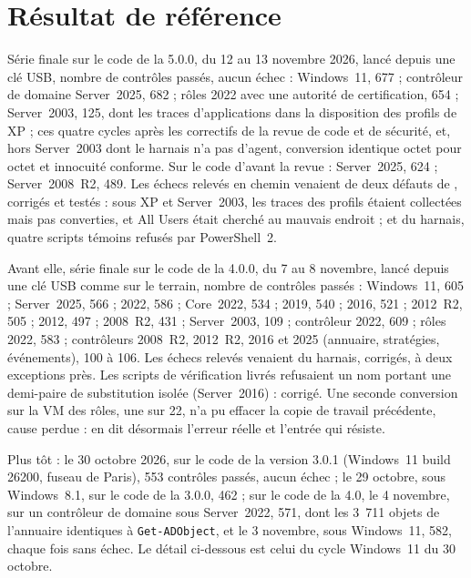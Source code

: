 \documentclass[11pt,a4paper,oneside]{report}
\begin{document}
\section{Résultat de référence}

Série finale sur le code de la 5.0.0, du 12 au 13 novembre 2026, \wac{} lancé
depuis une clé USB, nombre de contrôles passés, aucun échec : Windows~11, 677 ;
contrôleur de domaine Server~2025, 682 ; rôles 2022 avec une autorité de
certification, 654 ; Server~2003, 125, dont les traces d'applications dans la
disposition des profils de XP ; ces quatre cycles après les correctifs de la
revue de code et de sécurité, et, hors Server~2003 dont le harnais n'a pas
d'agent, conversion identique octet pour octet et innocuité conforme. Sur le code d'avant la revue : Server~2025, 624 ;
Server~2008~R2, 489. Les échecs relevés en
chemin venaient de deux défauts de \wac{}, corrigés et testés : sous XP et
Server~2003, les traces des profils étaient collectées mais pas converties, et
All Users était cherché au mauvais endroit ; et du harnais, quatre scripts
témoins refusés par PowerShell~2.

Avant elle, série finale sur le code de la 4.0.0, du 7 au 8 novembre, \wac{} lancé depuis
une clé USB comme sur le terrain, nombre de contrôles passés : Windows~11, 605 ;
Server~2025, 566 ; 2022, 586 ; Core~2022, 534 ; 2019, 540 ; 2016, 521 ;
2012~R2, 505 ; 2012, 497 ; 2008~R2, 431 ; Server~2003, 109 ; contrôleur 2022,
609 ; rôles 2022, 583 ; contrôleurs 2008~R2, 2012~R2, 2016 et 2025 (annuaire,
stratégies, événements), 100 à 106. Les échecs relevés venaient du harnais,
corrigés, à deux exceptions près. Les scripts de vérification livrés refusaient
un nom portant une demi-paire de substitution isolée (Server~2016) : corrigé.
Une seconde conversion sur la VM des rôles, une sur 22, n'a pu effacer la copie
de travail précédente, cause perdue : \wac{} en dit désormais l'erreur réelle et
l'entrée qui résiste.

Plus tôt : le 30 octobre 2026, sur le code de la version 3.0.1 (Windows~11
build 26200, fuseau de Paris), 553 contrôles passés, aucun échec ; le 29 octobre,
sous Windows~8.1, sur le code de la 3.0.0, 462 ; sur le code de la 4.0, le
4 novembre, sur un contrôleur de domaine sous Server~2022, 571, dont les 3~711
objets de l'annuaire identiques à \texttt{Get-ADObject}, et le 3 novembre, sous
Windows~11, 582, chaque fois sans échec. Le détail ci-dessous est celui du cycle
Windows~11 du 30 octobre.
\end{document}
